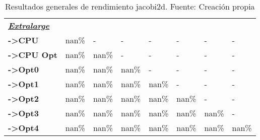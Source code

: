 \begin{table}[H]
\begin{tabular}{llllllll}
    \cellcolor[HTML]{DAE8FC} \textbf{\textbf{{\emph{{\underline{{Extralarge}}}}}}} &  &  &  &  &  &  &  \\
    \rowcolor[HTML]{EFEFEF} \cellcolor[HTML]{DAE8FC} \textbf{->CPU} & nan\% & - & - & - & - & - & - \\
    \cellcolor[HTML]{DAE8FC} \textbf{->CPU Opt} & nan\% & nan\% & - & - & - & - & - \\
    \rowcolor[HTML]{EFEFEF} \cellcolor[HTML]{DAE8FC} \textbf{->Opt0} & nan\% & nan\% & nan\% & - & - & - & - \\
    \cellcolor[HTML]{DAE8FC} \textbf{->Opt1} & nan\% & nan\% & nan\% & nan\% & - & - & - \\
    \rowcolor[HTML]{EFEFEF} \cellcolor[HTML]{DAE8FC} \textbf{->Opt2} & nan\% & nan\% & nan\% & nan\% & nan\% & - & - \\
    \cellcolor[HTML]{DAE8FC} \textbf{->Opt3} & nan\% & nan\% & nan\% & nan\% & nan\% & 	nan\% & - \\
    \rowcolor[HTML]{EFEFEF} \cellcolor[HTML]{DAE8FC} \textbf{->Opt4} & nan\% & nan\% & nan\% & nan\% & nan\% & 	nan\% & 	nan\% \\
    \end{tabular}
    \caption[Resultados generales de rendimiento jacobi2d]{{Resultados generales de rendimiento jacobi2d. Fuente: Creación propia}}
    \label{table_global_jacobi2d_PerformanceResults_speedup}
\end{table}